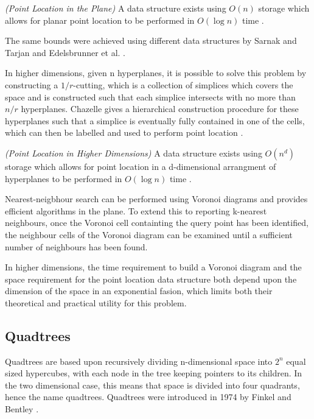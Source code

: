 \documentclass[mcs]{scsthesis}
\begin{document}
\begin{thm} \emph{(Point Location in the Plane)}
A data structure exists using \(O(n)\) storage which allows for planar
point location to be performed in \(O(\log n)\) time \cite{kirkpatrick}.
\end{thm}

The same bounds were achieved using different data structures by Sarnak and
Tarjan \cite{sarnak} and Edelsbrunner et al. \cite{edelsbrunner}.

In higher dimensions, given n hyperplanes, it is possible to solve this problem
by constructing a \(1/r\)-cutting, which is a collection of simplices which
covers the space and is constructed such that each simplice intersects with no
more than \(n/r\) hyperplanes. Chazelle gives a hierarchical construction
procedure for these hyperplanes such that a simplice is eventually fully
contained in one of the cells, which can then be labelled and used to perform
point location \cite{chazelle}.

\begin{thm} \emph{(Point Location in Higher Dimensions)}
A data structure exists using \(O(n^d)\) storage which allows for  
point location in a d-dimensional arrangment of hyperplanes to be performed in
\(O(\log n)\) time \cite{chazelle}.
\end{thm}

Nearest-neigbhour search can be performed using Voronoi diagrams and provides
efficient algorithms in the plane. To extend this to reporting k-nearest
neighbours, once the Voronoi cell containting the query point has been
identified, the neighbour cells of the Voronoi diagram can be examined until
a sufficient number of neighbours has been found. 

In higher dimensions, the time requirement to build a Voronoi diagram and the
space requirement for the point location data structure both depend upon the
dimension of the space in an exponential fasion, which limits both their
theoretical and practical utility for this problem.

\subsection{Quadtrees}

Quadtrees are based upon recursively dividing n-dimensional space into \(2^n\)
equal sized hypercubes, with each node in the tree keeping pointers to its
children.  In the two dimensional case, this means that space is divided into
four quadrants, hence the name quadtrees. Quadtrees were introduced in 1974 by
Finkel and Bentley \cite{quadtree}. 
\end{document}
